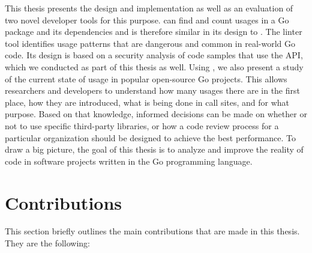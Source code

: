 This thesis presents the design and implementation as well as an evaluation of two novel developer tools for this
purpose.
\toolGeiger{} can find and count \unsafe{} usages in a Go package and its dependencies and is therefore similar in its
design to \toolCargoGeiger{}.
The linter tool \toolSafer{} identifies \unsafe{} usage patterns that are dangerous and common in real-world Go code.
Its design is based on a security analysis of code samples that use the \unsafe{} \acrshort{API}, which we conducted as
part of this thesis as well.
Using \toolGeiger{}, we also present a study of the current state of \unsafe{} usage in popular open-source Go projects.
This allows researchers and developers to understand how many usages there are in the first place, how they are
introduced, what is being done in \unsafe{} call sites, and for what purpose.
Based on that knowledge, informed decisions can be made on whether or not to use specific third-party libraries, or how
a code review process for a particular organization should be designed to achieve the best performance.
To draw a big picture, the goal of this thesis is to analyze and improve the reality of \unsafe{} code in software
projects written in the Go programming language.




\section{Contributions}\label{sec:introduction:contributions}

This section briefly outlines the main contributions that are made in this thesis.
They are the following:

